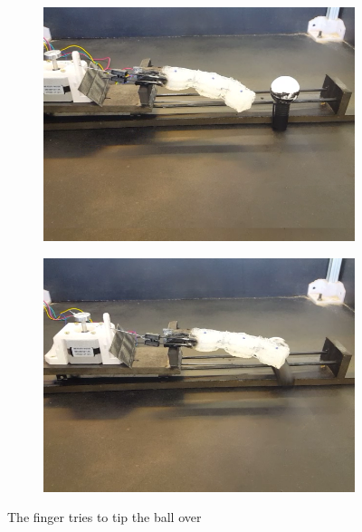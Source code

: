 \documentclass[letterpaper, 10 pt, conference]{ieeeconf}  %
\begin{document}
\begin{figure}[thpb]
\begin{subfigure}[b]{0.72in}
                \includegraphics[width=\textwidth]{figures/finger/finger8.png}
        \end{subfigure}
        \begin{subfigure}[b]{0.72in}                            
                \centering
                \includegraphics[width=\textwidth]{figures/finger/finger9.png}
        \end{subfigure}
        
        \caption{The finger tries to tip the ball over}
        \label{fig:fingerfun}
        \end{figure}
\end{document}
